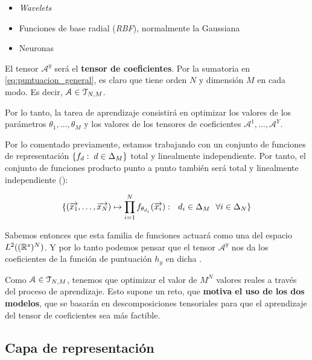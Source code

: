 \begin{itemize}
	\item \textit{Wavelets}
	\item Funciones de base radial (\textit{RBF}), normalmente la Gaussiana
	\item Neuronas
\end{itemize}

El tensor $\mathcal{A}^y$ será el \textbf{tensor de coeficientes}. Por la sumatoria en \eqref{eq:puntuacion_general}, es claro que tiene orden $N$ y dimensión $M$ en cada modo. Es decir, $\mathcal{A} \in \mathcal{T}_{N, M}$.

Por lo tanto, la tarea de aprendizaje consistirá en optimizar los valores de los parámetros $\theta_1, \ldots, \theta_M$ y los valores de los tensores de coeficientes $\mathcal{A}^1, \ldots, \mathcal{A}^Y$.

\begin{observacion}
	Por lo comentado previamente, estamos trabajando con un conjunto de funciones de representación $\{ f_d: \; d \in \Delta_{M} \}$ total y linealmente independiente. Por tanto, el conjunto de funciones producto punto a punto también será total y linealmente independiente ():

	\begin{equation}
		\{ (\overrightarrow{x_1}, \ldots, \overrightarrow{x_N}) \mapsto \prod_{i = 1}^{N} f_{\theta_{d_i}} (\overrightarrow{x_i}): \ \  d_i \in \Delta_{M} \ \  \forall i \in \Delta_{N}  \}
	\end{equation}


	Sabemos entonces que esta familia de funciones actuará como una  del espacio $L^2((\mathbb{R}^s)^N)$. Y por lo tanto podemos pensar que el tensor $\mathcal{A}^y$ nos da los coeficientes de la función de puntuación $h_y$ en dicha .
\end{observacion}

\begin{observacion}
	Como $\mathcal{A} \in \mathcal{T}_{N, M}$, tenemos que optimizar el valor de $M^N$ valores reales a través del proceso de aprendizaje. Esto supone un reto, que \textbf{motiva el uso de los dos modelos}, que se basarán en descomposiciones tensoriales para que el aprendizaje del tensor de coeficientes sea más factible.
\end{observacion}

\subsection{Capa de representación} \label{subs:capa_de_representacion}

